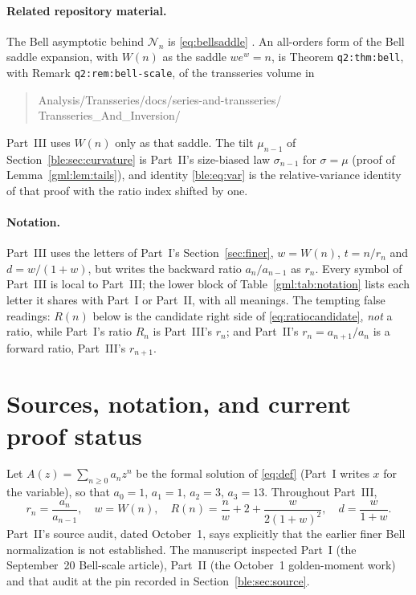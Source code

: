 \documentclass[11pt]{article}
\numberwithin{equation}{section}
\theoremstyle{definition}
\theoremstyle{remark}
\begin{document}
\paragraph{Related repository material.}
The Bell asymptotic behind $\mathcal N_n$ is \eqref{eq:bellsaddle}
\cite{dlmf-bell,moserwyman}. An all-orders form of the Bell saddle
expansion, with $W(n)$ as the saddle $we^w=n$, is Theorem
\texttt{q2:thm:bell}, with Remark \texttt{q2:rem:bell-scale}, of the
transseries volume in
\begin{quote}\small\ttfamily
Analysis/Transseries/docs/series-and-transseries/\\
Transseries\_And\_Inversion/
\end{quote}
Part~III uses $W(n)$ only as that saddle. The tilt $\mu_{n-1}$ of
Section~\ref{ble:sec:curvature} is Part~II's size-biased law $\sigma_{n-1}$
for $\sigma=\mu$ (proof of Lemma~\ref{gml:lem:tails}), and identity
\eqref{ble:eq:var} is the relative-variance identity of that proof with
the ratio index shifted by one.

\paragraph{Notation.}
Part~III uses the letters of Part~I's Section~\ref{sec:finer},
$w=W(n)$, $t=n/r_n$ and $d=w/(1+w)$, but writes the backward ratio
$a_n/a_{n-1}$ as $r_n$. Every symbol of Part~III is local to Part~III;
the lower block of Table~\ref{gml:tab:notation} lists each letter it
shares with Part~I or Part~II, with all meanings. The tempting false
readings: $R(n)$ below is the candidate right side of
\eqref{eq:ratiocandidate}, \emph{not} a ratio, while Part~I's ratio $R_n$
is Part~III's $r_n$; and Part~II's $r_n=a_{n+1}/a_n$ is a forward ratio,
Part~III's $r_{n+1}$.

\section{Sources, notation, and current proof status}\label{ble:sec:status}
Let $A(z)=\sum_{n\ge0}a_nz^n$ be the formal solution of \eqref{eq:def}
(Part~I writes $x$ for the variable), so that $a_0=1$, $a_1=1$, $a_2=3$,
$a_3=13$. Throughout Part~III,
\[
 r_n=\frac{a_n}{a_{n-1}},\quad w=W(n),\quad
 R(n)=\frac n w+2+\frac{w}{2(1+w)^2},\quad d=\frac{w}{1+w}.
\]
Part~II's source audit, dated October~1, says explicitly that the earlier
finer Bell normalization is not established. The manuscript inspected
Part~I (the September~20 Bell-scale article), Part~II (the October~1
golden-moment work) and that audit at the pin recorded in
Section~\ref{ble:sec:source}.
\end{document}
